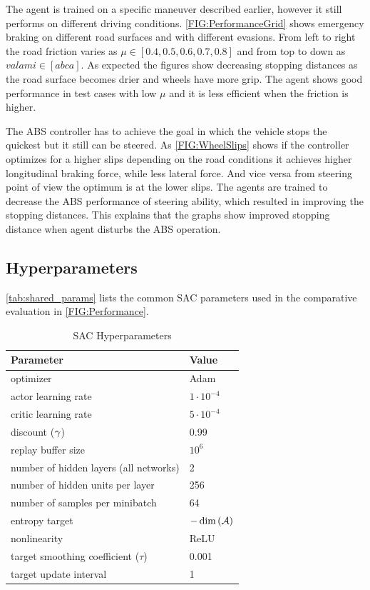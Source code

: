 \documentclass[a4paper, fleqn]{template/cas-dc}
\begin{document}
	The agent is trained on a specific maneuver described earlier, however it still performs on different driving conditions. \autoref{FIG:PerformanceGrid} shows emergency braking on different road surfaces and with different evasions. From left to right the road friction varies as $\mu \in [0.4, 0.5, 0.6, 0.7, 0.8]$ and from top to down as $ valami \in [a b c a]$. As expected the figures show decreasing stopping distances as the road surface becomes drier and wheels have more grip. The agent shows good performance in test cases with low $\mu$ and it is less efficient when the friction is higher. 
	
	The ABS controller has to achieve the goal in which the vehicle stops the quickest but it still can be steered. As \autoref{FIG:WheelSlips} shows if the controller optimizes for a higher slips depending on the road conditions it achieves higher longitudinal braking force, while less lateral force. And vice versa from steering point of view the optimum is at the lower slips. The agents are trained to decrease the ABS performance of steering ability, which resulted in improving the stopping distances. This explains that the graphs show improved stopping distance when agent disturbs the ABS operation. 
			
	\subsection{Hyperparameters}
	
	\autoref{tab:shared_params} lists the common SAC parameters used in the comparative evaluation in \autoref{FIG:Performance}.
	
	\begin{table}[b]
		\renewcommand{\arraystretch}{1.1}
		\centering		
		\vspace{1mm}
		\begin{tabular}{l| l }
			\toprule
			Parameter &  Value\\
			\midrule
			optimizer &Adam\\
			actor learning rate & $1 \cdot 10^{-4}$\\
			critic learning rate & $5 \cdot 10^{-4}$\\
			discount ($\gamma$) &  0.99\\
			replay buffer size & $10^6$\\
			number of hidden layers (all networks) & 2\\
			number of hidden units per layer & 256\\
			number of samples per minibatch & 64\\
			entropy target & $-\dim\left(\mathcal{A}\right)$ \\
			nonlinearity & ReLU\\
			target smoothing coefficient ($\tau$)& 0.001\\
			target update interval & 1\\			
			\bottomrule
		\end{tabular}
		\caption{SAC Hyperparameters}
		\label{tab:shared_params}
	\end{table}
	
\end{document}
